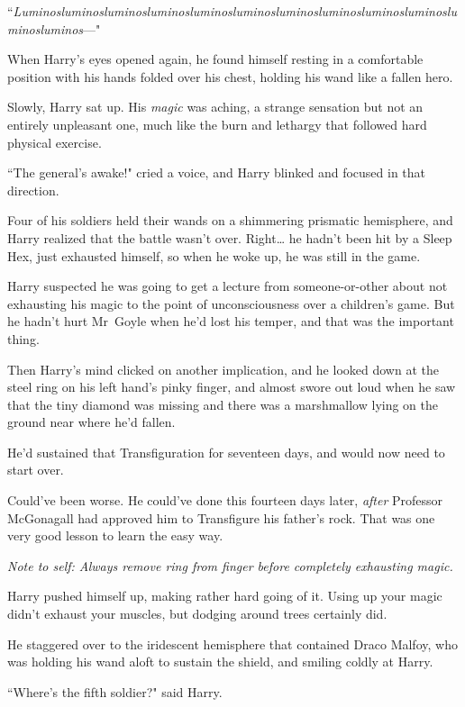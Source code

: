 ``\emph{Lu\-min\-os\-lu\-min\-os\-lu\-min\-os\-lu\-min\-os\-lu\-min\-os\-lu\-min\-os\-lu\-min\-os\-lu\-min\-os\-lu\-min\-os\-lu\-min\-os\-lu\-min\-os\-lu\-min\-os}—"

\later

When Harry's eyes opened again, he found himself resting in a comfortable position with his hands folded over his chest, holding his wand like a fallen hero.

Slowly, Harry sat up. His \emph{magic} was aching, a strange sensation but not an entirely unpleasant one, much like the burn and lethargy that followed hard physical exercise.

``The general's awake!" cried a voice, and Harry blinked and focused in that direction.

Four of his soldiers held their wands on a shimmering prismatic hemisphere, and Harry realized that the battle wasn't over. Right{\ldots} he hadn't been hit by a Sleep Hex, just exhausted himself, so when he woke up, he was still in the game.

Harry suspected he was going to get a lecture from someone-or-other about not exhausting his magic to the point of unconsciousness over a children's game. But he hadn't hurt Mr~Goyle when he'd lost his temper, and that was the important thing.

Then Harry's mind clicked on another implication, and he looked down at the steel ring on his left hand's pinky finger, and almost swore out loud when he saw that the tiny diamond was missing and there was a marshmallow lying on the ground near where he'd fallen.

He'd sustained that Transfiguration for seventeen days, and would now need to start over.

Could've been worse. He could've done this fourteen days later, \emph{after} Professor McGonagall had approved him to Transfigure his father's rock. That was one very good lesson to learn the easy way.

\emph{Note to self: Always remove ring from finger before completely exhausting magic.}

Harry pushed himself up, making rather hard going of it. Using up your magic didn't exhaust your muscles, but dodging around trees certainly did.

He staggered over to the iridescent hemisphere that contained Draco Malfoy, who was holding his wand aloft to sustain the shield, and smiling coldly at Harry.

``Where's the fifth soldier?" said Harry.


